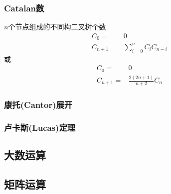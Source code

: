 \subsubsection{Catalan数}
$n$个节点组成的不同构二叉树个数
\begin{align*}
C_0     = & 0 \\
C_{n+1} = & \sum_{i=0}^n C_i C_{n-i}
\end{align*}
或
\begin{align*}
C_0     = & 0 \\
C_{n+1} = & \frac{2(2n+1)}{n+2} C_n
\end{align*}

\subsubsection{康托(Cantor)展开}

\subsubsection{卢卡斯(Lucas)定理}

\subsection{大数运算}

\subsection{矩阵运算}

